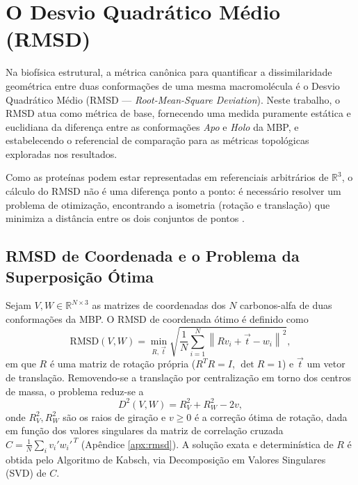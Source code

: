 \documentclass[12pt, a4paper]{article}
\theoremstyle{plain}
\theoremstyle{definition}
\theoremstyle{remark}
\newcommand{\ident}{\hspace{2em}}
\begin{document}
\section{O Desvio Quadrático Médio (RMSD)}\label{sec:rmsd}

\ident Na biofísica estrutural, a métrica canônica para quantificar a dissimilaridade
geométrica entre duas conformações de uma mesma macromolécula é o Desvio
Quadrático Médio (RMSD --- \emph{Root-Mean-Square Deviation}). Neste trabalho,
o RMSD atua como métrica de base, fornecendo uma medida puramente estática e
euclidiana da diferença entre as conformações \textit{Apo} e \textit{Holo} da MBP, e estabelecendo
o referencial de comparação para as métricas topológicas exploradas nos
resultados.

\ident Como as proteínas podem estar representadas em referenciais arbitrários de
$\mathbb{R}^3$, o cálculo do RMSD não é uma diferença ponto a ponto: é
necessário resolver um problema de otimização, encontrando a isometria
(rotação e translação) que minimiza a distância entre os dois conjuntos de
pontos \cite{maiorov1994}.

\subsection{RMSD de Coordenada e o Problema da Superposição Ótima} \label{secao_alg_kabsch}

\ident Sejam $V,W \in \mathbb{R}^{N\times 3}$ as matrizes de coordenadas dos $N$
carbonos-alfa de duas conformações da MBP. O RMSD de coordenada ótimo é
definido como
\begin{equation*}
    \mathrm{RMSD}(V,W) = \min_{R,\,\vec t}
    \sqrt{\frac{1}{N}\sum_{i=1}^{N}\left\| R v_i + \vec t - w_i \right\|^2},
    \label{eq:rmsd_coord}
\end{equation*}
em que $R$ é uma matriz de rotação própria ($R^TR=I$, $\det R = 1$) e $\vec t$
um vetor de translação. Removendo-se a translação por centralização em torno
dos centros de massa, o problema reduz-se a
\begin{equation*}
    D^2(V,W) = R_V^2 + R_W^2 - 2v,
    \label{eq:rmsd_reducido}
\end{equation*}
onde $R_V^2,R_W^2$ são os raios de giração e $v\ge 0$ é a correção ótima de
rotação, dada em função dos valores singulares da matriz de correlação
cruzada $C = \frac{1}{N}\sum_i v_i' w_i'^{\,T}$ (Apêndice \ref{apx:rmsd}). A solução exata
e determinística de $R$ é obtida pelo Algoritmo de Kabsch, via
Decomposição em Valores Singulares (SVD) de $C$.
\end{document}
